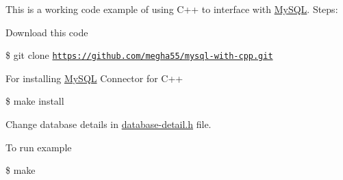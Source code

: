 



This is a working code example of using C++ to interface with \hyperlink{classMySQL}{My\-S\-Q\-L}. Steps\-:

\begin{DoxyItemize}
\item Download this code \par
 \$ git clone \href{https://github.com/megha55/mysql-with-cpp.git}{\tt https\-://github.\-com/megha55/mysql-\/with-\/cpp.\-git}\end{DoxyItemize}
\begin{DoxyItemize}
\item For installing \hyperlink{classMySQL}{My\-S\-Q\-L} Connector for C++ \par
 \$ make install\end{DoxyItemize}
\begin{DoxyItemize}
\item Change database details in \hyperlink{database-detail_8h}{database-\/detail.\-h} file.\end{DoxyItemize}
\begin{DoxyItemize}
\item To run example \par
 \$ make 

 \end{DoxyItemize}
